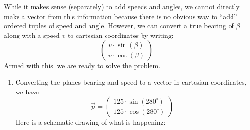 \documentclass{ximera}
\begin{document}
\begin{example}[Navigation]
\begin{solution}
While it makes sense (separately) to add speeds and angles, we cannot
directly make a vector from this information because there is no
obvious way to ``add'' ordered tuples of speed and angle. However, we
can convert a true bearing of $\beta$ along with a speed $v$ to
cartesian coordinates by writing:
\[
\begin{pmatrix}v\cdot \sin(\beta)\\ v \cdot \cos(\beta)\end{pmatrix}
\]
Armed with this, we are ready to solve the problem.
\begin{enumerate}
\item  Converting the planes bearing and speed to a vector in cartesian
  coordinates, we have
  \[
  \vec{p} = \begin{pmatrix}125\cdot \sin(280^\circ)\\ 125 \cdot \cos(280^\circ)\end{pmatrix}
  \]
  Here is a schematic drawing of what is happening:

  \begin{center}
  \end{center}




\end{enumerate}
\end{solution}
\end{example}
\end{document}
